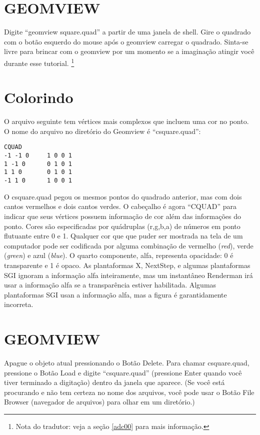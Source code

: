 \documentclass[12pt,a4paper]{book}
\begin{document}
\section{GEOMVIEW}

Digite ``geomview square.quad'' a partir de uma janela de shell.
Gire o quadrado com o botão esquerdo do mouse
após o geomview carregar o quadrado. Sinta-se livre para brincar com o geomview por um momento se
a imaginação atingir você durante esse tutorial.
\footnote{Nota do tradutor: veja a seção \ref{adc00} para mais informação.}

\section{Colorindo}

O arquivo seguinte tem vértices mais complexos que incluem uma cor no ponto. 
O nome do arquivo no diretório do Geomview é ``csquare.quad'':

\begin{verbatim}
CQUAD
-1 -1 0		1 0 0 1
1 -1 0		0 1 0 1
1 1 0		0 1 0 1
-1 1 0		1 0 0 1
\end{verbatim}

O csquare.quad pegou os mesmos pontos do quadrado anterior, mas com dois cantos vermelhos e
dois cantos verdes. O cabeçalho é agora ``CQUAD'' para indicar que seus
vértices possuem informação de cor além das informações do ponto.
Cores são especificadas por quádruplas (r,g,b,a) de números em ponto flutuante
entre 0 e 1. Qualquer cor que que puder ser mostrada na tela de um computador
pode ser codificada por alguma combinação de vermelho (\textit{red}), verde (\textit{green}) e azul (\textit{blue}). O quarto
componente, alfa, representa opacidade: 0 é transparente e 1 é
opaco. As plantaformas X, NextStep, e algumas plantaformas SGI ignoram a informação
alfa inteiramente, mas um instantâneo Renderman irá usar a informação
alfa se a transparência estiver habilitada. Algumas plantaformas SGI usan a
informação alfa, mas a figura é garantidamente incorreta.

\section{GEOMVIEW}

Apague o objeto atual pressionando o Botão Delete.  Para
chamar csquare.quad, pressione o Botão Load e digite ``csquare.quad'' (pressione
Enter quando você tiver terminado a digitação) dentro da janela que aparece. (Se
você está procurando e não tem certeza no nome dos arquivos, você pode usar o
Botão File Browser (navegador de arquivos) para olhar em um diretório.)
\end{document}
